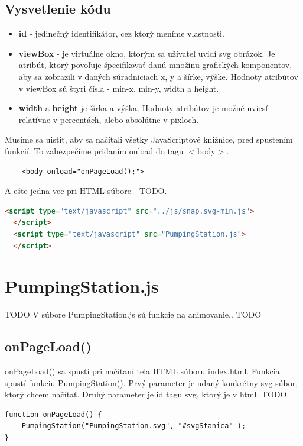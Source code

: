 \subsection{Vysvetlenie kódu}
\begin{itemize}
\item  \textbf{id} - jedinečný identifikátor, cez ktorý meníme vlastnosti.
\item 	\textbf{viewBox} - je virtuálne okno, ktorým sa užívateľ uvidí svg obrázok. Je atribút, ktorý povoľuje špecifikovať danú množinu grafických komponentov, aby sa zobrazili v daných súradniciach x, y a šírke, výške. Hodnoty atribútov v viewBox sú štyri čísla - min-x, min-y, width a height. 
\item 	\textbf{width} a \textbf{height} je šírka a výška. Hodnoty atribútov je možné uviesť relatívne v percentách, alebo absolútne v pixloch. 
\end{itemize}

Musíme sa uistiť, aby sa načítali všetky JavaScriptové knižnice, pred spustením funkcií. To zabezpečíme pridaním  onload do tagu $<$body$>$. 
\begin{lstlisting}
	<body onload="onPageLoad();">
\end{lstlisting}

A ešte jedna vec pri HTML súbore - TODO. 
\begin{lstlisting}[language = HTML]
  <script type="text/javascript" src="../js/snap.svg-min.js">
  </script>
  <script type="text/javascript" src="PumpingStation.js">
  </script>
\end{lstlisting}


\section{PumpingStation.js}
TODO
V súbore PumpingStation.js sú funkcie na animovanie.. TODO
\subsection{onPageLoad()}
onPageLoad() sa spustí pri načítaní tela HTML súboru index.html. Funkcia spustí funkciu PumpingStation(). Prvý parameter je udaný konkrétny svg súbor, ktorý chcem načítať. Druhý parameter je id tagu svg, ktorý je v html. TODO

\begin{lstlisting}
function onPageLoad() {
	PumpingStation("PumpingStation.svg", "#svgStanica" );
}
\end{lstlisting}

